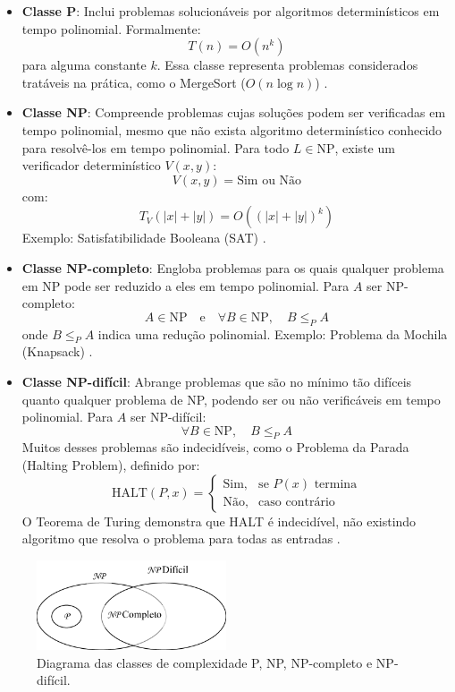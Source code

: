 \documentclass[12pt, a4paper]{article}
\begin{document}
\begin{itemize}
    \item \textbf{Classe P}: Inclui problemas solucionáveis por algoritmos determinísticos em tempo polinomial. Formalmente:
    \[
    T(n) = O(n^k)
    \]
    para alguma constante \( k \). Essa classe representa problemas considerados tratáveis na prática, como o MergeSort (\( O(n \log n) \)) .

    \item \textbf{Classe NP}: Compreende problemas cujas soluções podem ser verificadas em tempo polinomial, mesmo que não exista algoritmo determinístico conhecido para resolvê-los em tempo polinomial. Para todo \( L \in \text{NP} \), existe um verificador determinístico \( V(x,y) \):
    \[
    V(x, y) = \text{Sim ou Não}
    \]
    com:
    \[
    T_V(|x| + |y|) = O((|x| + |y|)^k)
    \]
    Exemplo: Satisfatibilidade Booleana (SAT) .

    \item \textbf{Classe NP-completo}: Engloba problemas para os quais qualquer problema em NP pode ser reduzido a eles em tempo polinomial. Para \( A \) ser NP-completo:
    \[
    A \in \text{NP} \quad \text{e} \quad \forall B \in \text{NP}, \quad B \leq_P A
    \]
    onde \( B \leq_P A \) indica uma redução polinomial. Exemplo: Problema da Mochila (Knapsack) .

    \item \textbf{Classe NP-difícil}: Abrange problemas que são no mínimo tão difíceis quanto qualquer problema de NP, podendo ser ou não verificáveis em tempo polinomial. Para \( A \) ser NP-difícil:
    \[
    \forall B \in \text{NP}, \quad B \leq_P A
    \]
    Muitos desses problemas são indecidíveis, como o Problema da Parada (Halting Problem), definido por:
    \[
    \text{HALT}(P,x) = 
    \begin{cases}
    \text{Sim}, & \text{se } P(x) \text{ termina} \\
    \text{Não}, & \text{caso contrário}
    \end{cases}
    \]
    O Teorema de Turing demonstra que HALT é indecidível, não existindo algoritmo que resolva o problema para todas as entradas .
\end{itemize}

\begin{figure}[H]
    \centering
    \includegraphics[width=0.5\textwidth]{img/diagramaDeClasses.png}
    \caption{Diagrama das classes de complexidade P, NP, NP-completo e NP-difícil.}
    \label{fig:complexidade}
\end{figure}
\end{document}
